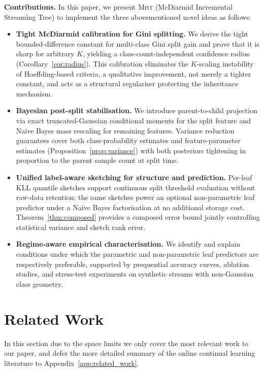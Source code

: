 \documentclass{article}
\newcommand{\mist}{\textsc{Mist}}
\begin{document}
\noindent
\textbf{Contributions.} In this paper, we present \mist{} (McDiarmid Incremental Streaming Tree) to implement the three abovementioned novel ideas as follows:
\begin{itemize}
  \item \textbf{Tight McDiarmid calibration for Gini splitting.}
  We derive the tight bounded-difference constant for multi-class Gini split
  gain and prove that it is sharp for arbitrary $K$, yielding a
  class-count-independent confidence radius (Corollary~\ref{cor:radius}).
  This calibration eliminates the $K$-scaling instability of Hoeffding-based
  criteria, a qualitative improvement, not merely a tighter constant, and
  acts as a structural regulariser protecting the inheritance mechanism.
  \item \textbf{Bayesian post-split stabilisation.}
  We introduce parent-to-child projection via exact truncated-Gaussian
  conditional moments for the split feature and Naive Bayes mass rescaling for
  remaining features. Variance reduction guarantees cover both
  class-probability estimates 
  and feature-parameter estimates
  (Proposition~\ref{prop:variance}) 
  with both
  posteriors tightening in proportion to the parent sample count at split time.
  \item \textbf{Unified label-aware sketching for structure and prediction.}
  Per-leaf KLL quantile sketches support continuous split threshold evaluation
  without raw-data retention; the same sketches power an optional
  non-parametric leaf predictor under a Naive Bayes factorisation at no
  additional storage cost. Theorem~\ref{thm:composed} provides a composed
  error bound jointly controlling statistical variance and sketch rank error.
  \item \textbf{Regime-aware empirical characterisation.}
  We identify and explain conditions under which the parametric and
  non-parametric leaf predictors are respectively preferable, supported by
  prequential accuracy curves, ablation studies, and stress-test experiments
  on synthetic streams with non-Gaussian class geometry.
\end{itemize}
\section{Related Work}
In this section due to the space limits we only cover the most relevant work to our paper, and defer the more detailed summary of the online continual learning literature to Appendix~\ref{app:related_work}. 
\end{document}
